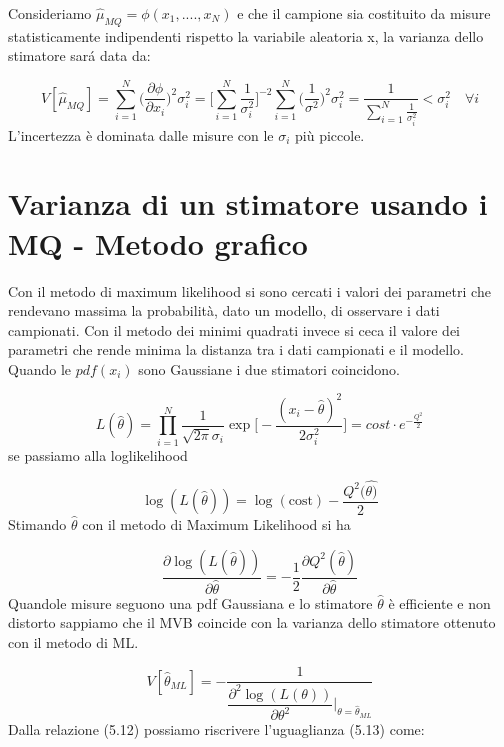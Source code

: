 Consideriamo $\hat{\mu}_{MQ} = \phi(x_1,....,x_N)$ e che il campione sia costituito da misure statisticamente indipendenti rispetto la variabile aleatoria x, la varianza dello stimatore sar\'{a} data da:

\begin{equation*}
	V[\hat{\mu}_{MQ}] = \sum_{i=1}^{N} \Big (\dfrac{\partial \phi}{\partial x_{i}} \Big)^2 \sigma_i^2 = \Big [\sum_{i=1}^N \frac{1}{\sigma^2_i} \Big ]^{-2} \sum_{i=1}^N \Big(\dfrac{1}{\sigma^2}\Big)^2 \sigma_i^2 = \dfrac{1}{\sum_{i=1}^N \frac{1}{\sigma^2_i}} < \sigma_i^2 \quad \forall i  
\end{equation*}
L'incertezza \`{e} dominata dalle misure con le $\sigma_{i}$ pi\`{u} piccole.

\section{Varianza di un stimatore usando i MQ - Metodo grafico}

Con il metodo di maximum likelihood si sono cercati i valori dei parametri che rendevano massima la probabilit\`{a}, dato un modello, di osservare i dati campionati. Con il metodo dei minimi quadrati invece si ceca il valore dei parametri che rende minima la distanza tra i dati campionati e il modello. Quando le $pdf(x_i)$ sono Gaussiane i due stimatori coincidono.

\begin{equation*}
	L(\hat{\theta}) = \prod_{i=1}^N \dfrac{1}{\sqrt{2\pi}\sigma_i}\exp{\Big [-\frac{ (x_i-\hat{\theta})^2}{2 \sigma_i^2} \Big]} = cost \cdot e^{-\frac{Q^2}{2}}
\end{equation*}
se passiamo alla loglikelihood

\begin{equation*}
	\log(L(\hat{\theta})) = \log(\text{cost}) - \dfrac{Q^2(\hat{\theta)}}{2}
\end{equation*}
Stimando $\hat{\theta}$ con il metodo di Maximum Likelihood si ha

\begin{equation}
	\dfrac{\partial \log(L(\hat{\theta}))}{\partial \hat{\theta}} = - \dfrac{1}{2}\dfrac{\partial Q^2(\hat{\theta})}{\partial \hat{\theta}}
\end{equation}
Quandole misure seguono una pdf Gaussiana e lo stimatore $\hat{\theta}$ \`{e} efficiente e non distorto sappiamo che il MVB coincide con la varianza dello stimatore ottenuto con il metodo di ML.

\begin{equation}
	V[\hat{\theta}_{ML}] = - \dfrac{1}{\dfrac{\partial^2 \log(L(\theta))}{\partial \theta^2} \Big \vert_{\theta = \hat{\theta}_{ML}}} 
\end{equation}
Dalla relazione (5.12) possiamo riscrivere l'uguaglianza (5.13) come:

